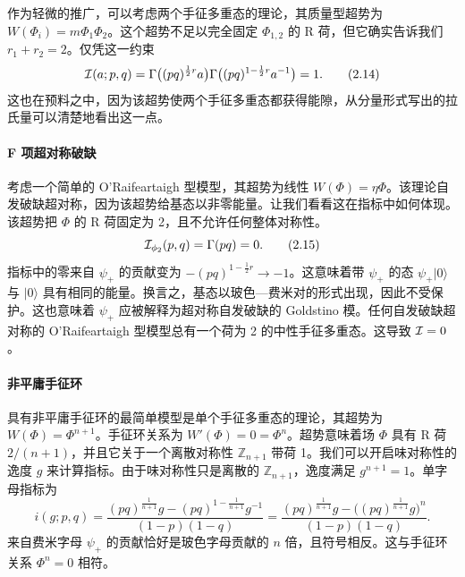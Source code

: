 作为轻微的推广，可以考虑两个手征多重态的理论，其质量型超势为 $W(\Phi_i)=m\Phi_1\Phi_2$。这个超势不足以完全固定 $\Phi_{1,2}$ 的 R 荷，但它确实告诉我们 $r_1+r_2=2$。仅凭这一约束
\[
\mathcal{I}(a;p,q)=\Gamma\big((pq)^{\frac12 r}a\big)\Gamma\big((pq)^{1-\frac12 r}a^{-1}\big)=1 .
\tag{2.14}
\]
这也在预料之中，因为该超势使两个手征多重态都获得能隙，从分量形式写出的拉氏量可以清楚地看出这一点。

\paragraph{F 项超对称破缺} 考虑一个简单的 O'Raifeartaigh 型模型，其超势为线性 $W(\Phi)=\eta\Phi$。该理论自发破缺超对称，因为该超势给基态以非零能量。让我们看看这在指标中如何体现。该超势把 $\Phi$ 的 R 荷固定为 2，且不允许任何整体对称性。
\[
\mathcal{I}_{\phi_2}(p,q)=\Gamma(pq)=0 .
\tag{2.15}
\]
指标中的零来自 $\psi_+$ 的贡献变为 $-(pq)^{1-\frac12 r}\to-1$。这意味着带 $\psi_+$ 的态 $\psi_+|0\rangle$ 与 $|0\rangle$ 具有相同的能量。换言之，基态以玻色—费米对的形式出现，因此不受保护。这也意味着 $\psi_+$ 应被解释为超对称自发破缺的 Goldstino 模。任何自发破缺超对称的 O'Raifeartaigh 型模型总有一个荷为 2 的中性手征多重态。这导致 $\mathcal{I}=0$。

\paragraph{非平庸手征环} 具有非平庸手征环的最简单模型是单个手征多重态的理论，其超势为 $W(\Phi)=\Phi^{n+1}$。手征环关系为 $W'(\Phi)=0=\Phi^n$。超势意味着场 $\Phi$ 具有 R 荷 $2/(n+1)$，并且它关于一个离散对称性 $\mathbb{Z}_{n+1}$ 带荷 1。我们可以开启味对称性的逸度 $g$ 来计算指标。由于味对称性只是离散的 $\mathbb{Z}_{n+1}$，逸度满足 $g^{n+1}=1$。单字母指标为
\[
i(g;p,q)=\frac{(pq)^{\frac{1}{n+1}}g-(pq)^{1-\frac{1}{n+1}}g^{-1}}{(1-p)(1-q)}
=\frac{(pq)^{\frac{1}{n+1}}g-\big((pq)^{\frac{1}{n+1}}g\big)^n}{(1-p)(1-q)} .
\tag{2.16}
\]
来自费米字母 $\psi_+$ 的贡献恰好是玻色字母贡献的 $n$ 倍，且符号相反。这与手征环关系 $\Phi^n=0$ 相符。

